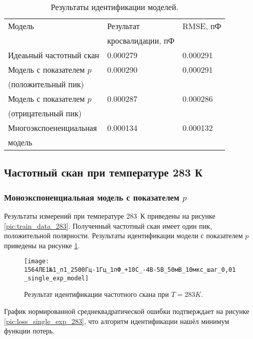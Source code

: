 	\begin{table}[!htp]
	\centering
	\caption{Результаты идентификации моделей.}
	\begin{tabular}{|l|l|l|}
		\hline
		Модель                    & Результат         & RMSE, пФ \\ 
		                          & кросвалидации, пФ &          \\ \hline
		Идеаьный частотный скан   & 0.000279          & 0.000291 \\ \hline
		Модель с показателем $p$  & 0.000290          & 0.000291 \\
		(положительный пик)       &                   &          \\ \hline
		Модель с показателем $p$  & 0.000287          & 0.000286 \\ 
		(отрицательный пик)       &                   &          \\ \hline
		Многоэкспоененциальная    & 0.000134          & 0.000132 \\
		модель                    &                   &          \\ \hline
	\end{tabular}
	\label{table:model_comparison_263}
	\end{table}



	\newpage
	\subsection{Частотный скан при температуре 283 К}
	\subsubsection{Моноэкспоненциальная модель с показателем $p$}
	Результаты измерений при температуре 283~К приведены на рисунке 
	\ref{pic:train_data_283}. Полученный частотный скан имеет один пик,
	положительной полярности. Результаты идентификации модели с показателем 
	$p$ приведены на рисунке \ref{pic:single_exp_model_283}.

	\begin{figure}[!htp]
		\centering
		\texttt{[image: 1564ЛЕ1№1\_п1\_2500Гц-1Гц\_1пФ\_+10С\_-4В-5В\_50мВ\_10мкс\_шаг\_0,01\_single\_exp\_model]}
		\caption{Результат идентификации частотного скана при $T=283K$.}
		\label{pic:single_exp_model_283}
	\end{figure}

	График нормированной среднеквадратической ошибки подтверждает на рисунке
	\ref{pic:loss_single_exp_283}, что алгоритм идентификации нашёл минимум 
	функции потерь.

